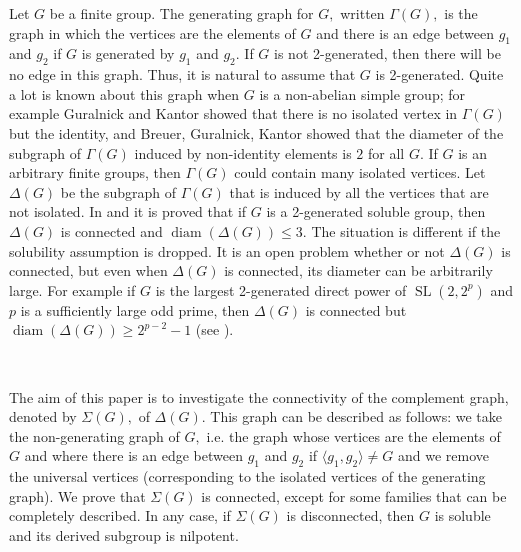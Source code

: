\documentclass{amsart}
\DeclareMathOperator{\diam}{diam}
\DeclareMathOperator{\ssl}{SL}
\numberwithin{equation}{section}
\begin{document}
Let $G$ be a finite group. The generating graph for $G,$ written $\Gamma(G),$ is the graph in which the vertices are the elements of $G$ and there is an edge between $g_1$ and $g_2$ if $G$ is generated by $g_1$ and $g_2.$ If $G$ is not 2-generated, then there will be no edge in this graph. Thus, it is natural to assume that $G$ is 2-generated.
Quite a lot is known about this graph when $G$ is a non-abelian simple group; for example Guralnick and Kantor \cite{guka} showed that there is no
isolated vertex in $\Gamma(G)$ but the identity, and Breuer, Guralnick, Kantor
\cite{BGK} showed that the diameter of the subgraph of $\Gamma(G)$ induced by non-identity elements is  $2$
for all $G$.
If $G$ is an arbitrary finite groups, then $\Gamma(G)$ could contain many isolated vertices.
Let $\Delta(G)$ be the subgraph of $\Gamma(G)$ that is induced by all  the vertices that are not isolated.
In \cite{cl} and \cite{diam} it is  proved that if $G$ is a 2-generated soluble group, then $\Delta(G)$ is connected and $\diam(\Delta(G))\leq 3.$ 
The situation is  different if the solubility assumption is dropped. It is an open problem whether or not  $\Delta(G)$ is connected, but even when $\Delta(G)$ is connected, its diameter
can be arbitrarily large. For example if $G$ is the largest 2-generated direct power of $\ssl(2,2^p)$ and $p$ is a sufficiently large odd prime, then $\Delta(G)$ is connected but $\diam(\Delta(G))\geq 2^{p-2}-1$
(see \cite[Theorem 5.4]{CL2}).
	
\

The aim of this paper is to investigate the connectivity of the
complement graph, denoted by $\Sigma(G),$ of $\Delta(G).$ This graph can be described as follows: we take the  non-generating graph of $G,$ i.e. the graph whose vertices are the elements of $G$ and where there is an edge between $g_1$ and $g_2$ if  $\langle g_1, g_2\rangle\neq G$ and we remove the universal vertices (corresponding to the isolated vertices of the generating graph).
We prove that $\Sigma(G)$ is connected, except for some families that can be completely described. In any case, if $\Sigma(G)$ is disconnected, then $G$ is soluble and its derived subgroup is nilpotent. 
	
\end{document}
